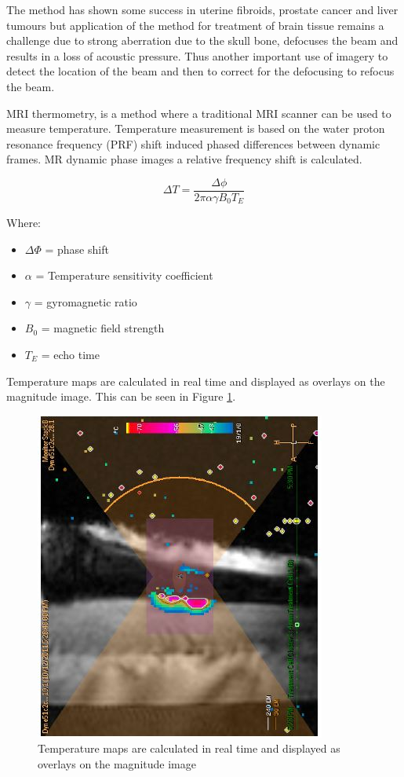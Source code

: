 \documentclass[11pt]{article} %
\begin{document}
	The method has shown some success in uterine fibroids, prostate cancer and liver tumours but application of the method for treatment of brain tissue remains a challenge due to strong aberration due to the skull bone, defocuses the beam and results in a loss of acoustic pressure. Thus another important use of imagery to detect the location of the beam and then to correct for the defocusing to refocus the beam. 
	
	MRI thermometry, is a method where a traditional MRI scanner can be used to measure temperature. Temperature measurement is based on the water proton resonance frequency (PRF) shift induced phased differences between dynamic frames. MR dynamic phase images a relative frequency shift is calculated. 
	
	\begin{equation}
	\Delta T= \frac{\Delta \phi}{2 \pi \alpha \gamma B_0 T_E}
	\end{equation}
	
	Where: 
	\begin{itemize}
		\item $\Delta \Phi $ = phase shift 
		\item $\alpha$ = Temperature sensitivity coefficient 
		\item $\gamma$ = gyromagnetic ratio
		\item $B_0$ = magnetic field strength
		\item $T_E$ = echo time 
	\end{itemize}

	Temperature maps are calculated in real time and displayed as overlays on the magnitude image. This can be seen in Figure \ref{fig:mriimage}.
	
	\begin{figure}
		\centering
		\includegraphics[width=0.7\linewidth]{Report_images/MRIimage}
		\caption{Temperature maps are calculated in real time and displayed as overlays on the magnitude image}
		\label{fig:mriimage}
	\end{figure}
	
\end{document}
